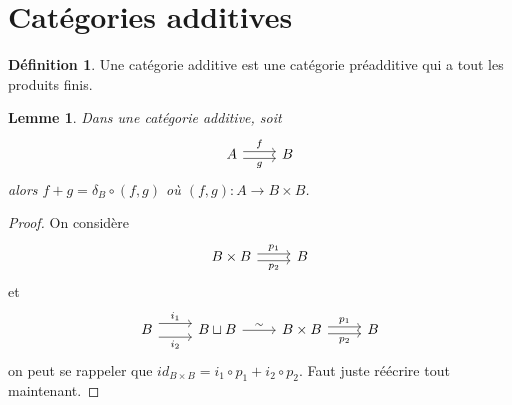 \documentclass[a4paper,12pt]{book}
\theoremstyle{plain}
\newtheorem{lem}[subsection]{Lemme}
\theoremstyle{definition}
\newtheorem{defn}[subsection]{Définition}
\theoremstyle{remark}
\begin{document}
\section{Catégories additives}
\begin{defn}
    Une catégorie additive est une catégorie préadditive qui a tout les
    produits finis.
\end{defn}
\begin{lem}
    Dans une catégorie additive, soit
\[\begin{tikzcd}
	A & B
	\arrow["f", shift left, from=1-1, to=1-2]
	\arrow["g"', shift right, from=1-1, to=1-2]
\end{tikzcd}\]
    alors $f+g=\delta_B\circ(f,g)$ où $(f,g)\colon A\to B\times B$.
\end{lem}
\begin{proof}
On considère
\[\begin{tikzcd}
	B\times B & B
	\arrow["p_1", shift left, from=1-1, to=1-2]
	\arrow["p_2"', shift right, from=1-1, to=1-2]
\end{tikzcd}\]
et 
\[\begin{tikzcd}
	B & {B\sqcup B} & {B\times B} & B
	\arrow["{i_1}", shift left=2, from=1-1, to=1-2]
	\arrow["{i_2}"', shift right=2, from=1-1, to=1-2]
	\arrow["\sim", from=1-2, to=1-3]
	\arrow["{p_1}", shift left, from=1-3, to=1-4]
	\arrow["{p_2}"', shift right, from=1-3, to=1-4]
\end{tikzcd}\]
on peut se rappeler que $id_{B\times B}=i_1\circ p_1+i_2\circ p_2$.
Faut juste réécrire tout maintenant.
\end{proof}
\end{document}

